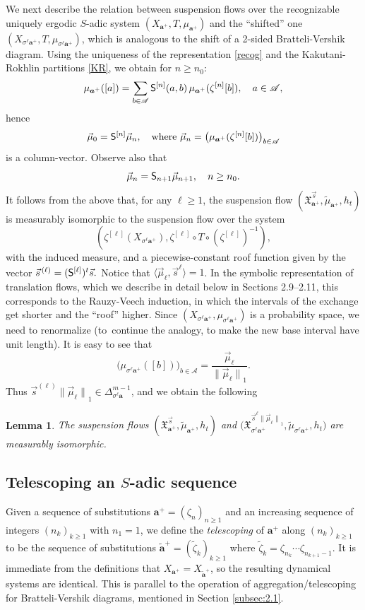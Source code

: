 \documentclass[JEP,XML,SOM,Unicode]{cedram}
\let\mathcal\mathscr
\theoremstyle{plain}
\newtheorem{lemma}[theorem]{Lemma}
\theoremstyle{definition}
\let\wt\widetilde
\newcommand\bom{{\boldsymbol a}}\let\ba\bom
\let\sig\sigma
\newcommand\Xx{\mathfrak{X}}
\newcommand\Ak{\mathcal{A}}
\newcommand\Sf{{\sf S}}
\newcommand\be{\begin{equation}}
\newcommand\ee{\end{equation}}
\begin{document}
We next describe the relation between suspension flows over the recognizable uniquely ergodic $S$-adic system $(X_{\bom^+},T, \mu_{\bom^+})$ and the ``shifted'' one $(X_{\sig^\ell\bom^+}, T, \mu_{\sig^\ell\bom^+})$, which is analogous to the shift of a 2-sided Bratteli-Vershik diagram.
Using the uniqueness of the representation \eqref{recog} and the Kakutani-Rokhlin partitions \eqref{KR}, we obtain for $n\ge n_0$:
\[
\mu_{\bom^+}([a]) = \sum_{b\in \Ak}\Sf^{[n]}(a,b)\,\mu_{\bom^+}(\zeta^{[n]}[b]),\quad a\in \Ak,
\]
hence
\be \label{eq-measure}
\vec{\mu}_0 = \Sf^{[n]}\vec{\mu}_n,\quad \text{where } \vec{\mu}_n = \bigl(\mu_{\bom^+}(\zeta^{[n]}[b])\bigr)_{b\in \Ak}
\ee
is a column-vector. Observe also that
\be \label{eq-measure2}
\vec{\mu}_n = \Sf_{n+1}\vec{\mu}_{n+1},\quad n\ge n_0.
\ee
It follows from the above that, for any $\ell\ge 1$, the suspension flow $(\Xx_{\ba^+}^{\vec{s}},\wt\mu_{\bom^+},h_t)$ is measurably isomorphic to the suspension flow over the system
\[
(\zeta^{[\ell]}(X_{\sig^\ell\ba^+}), \zeta^{[\ell]}\circ T\circ (\zeta^{[\ell]})^{-1}),
\]
with the induced measure, and a piecewise-constant roof function given by the vector
$
\vec{s}^{\,(\ell)}= (\Sf^{[\ell]})^t \vec{s}.
$
Notice that $\langle \vec\mu_\ell, \vec s^{\ell}\rangle=1$. In the symbolic representation of translation flows, which we describe in detail below in Sections 2.9--2.11, this corresponds to the Rauzy-Veech induction, in which the intervals of the exchange get shorter and the ``roof'' higher. Since $(X_{\sig^\ell\bom^+}, \mu_{\sig^\ell\bom^+})$ is a probability space, we need to renormalize
(to~continue the analogy, to make the new base interval have unit length).
It is easy to see that
\[
\bigl(\mu_{\sig^\ell \bom^+}([b])\bigr)_{b\in \Ak} = \frac{\vec\mu_\ell}{{\|\vec \mu_\ell\|}_1}.
\]
Thus $\vec s^{(\ell)}{\|\vec \mu_\ell\|}_1\in \Delta^{m-1}_{\sig^\ell\bom}$, and we obtain the following
\begin{lemma} \label{lem-shift}
The suspension flows $(\Xx_{\ba^+}^{\vec{s}},\wt{\mu}_{\bom^+},h_t)$ and $\bigl(\Xx_{\sig^\ell\ba^+}^{\vec{s}^{\ell}{\|\vec \mu_\ell\|}_1},\wt{\mu}_{\sig^\ell\bom^+},h_t\bigr)$ are measurably isomorphic.
\end{lemma}

\subsection{Telescoping an $S$-adic sequence \cite[5.2]{BSTY}}
Given a sequence of substitutions $\ba^+ = (\zeta_n)_{n\ge 1}$ and an increasing sequence of integers $(n_k)_{k\ge 1}$ with $n_1=1$, we define the \emph{telescoping} of $\ba^+$ along $(n_k)_{k\ge 1}$
to be the sequence of substitutions $\wt\ba^+ = (\wt \zeta_k)_{k\ge 1}$ where $\wt\zeta_k = \zeta_{n_k}\cdots \zeta_{n_{k+1}-1}$. It is immediate from the definitions that $X_{\ba^+}=X_{\wt\ba^+}$, so the
resulting dynamical systems are identical. This is parallel to the operation of aggregation/telescoping for Bratteli-Vershik diagrams, mentioned in Section \ref{subsec:2.1}.
\end{document}
